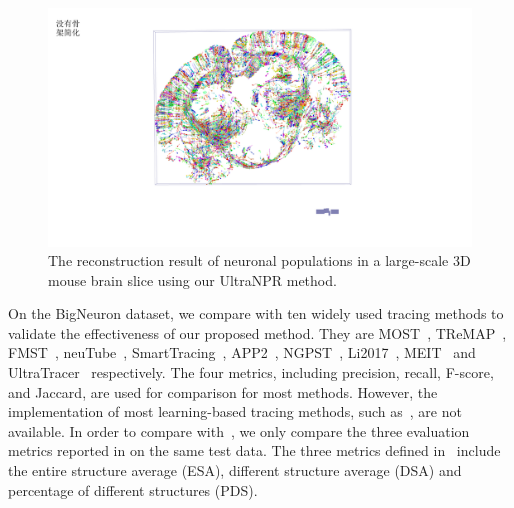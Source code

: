 \begin{figure}[t]
	\centering
	\includegraphics[width=1\columnwidth]{./Illustrations/brain_slice.pdf}
	\caption{The reconstruction result of neuronal populations in a large-scale 3D mouse brain slice using our UltraNPR method.}
	\label{fig:reconstruct_brain}
\end{figure}

On the BigNeuron dataset, we compare with ten widely used tracing methods to validate the effectiveness of our proposed method.
They are MOST~\cite{Wu2014}, TReMAP~\cite{Zhou2016}, FMST~\cite{Yang2019}, neuTube~\cite{Feng2015}, SmartTracing~\cite{Chen2015}, APP2~\cite{Xiao2013}, NGPST~\cite{Quan2015}, Li2017~\cite{Li2017},   MEIT~\cite{Wang2018} and UltraTracer~\cite{Peng2017} respectively.
%
The four metrics, including precision, recall, F-score, and Jaccard, are used for comparison for most methods.
However, the implementation of most learning-based tracing methods, such as~\cite{Li2017}, are not available.
In order to compare with~\cite{Li2017}, we only compare the three evaluation metrics reported in \cite{Li2017} on the same test data.
%
The three metrics defined in~\cite{Peng2010a} include the entire structure average (ESA), different structure average (DSA) and percentage of different structures (PDS).
%

